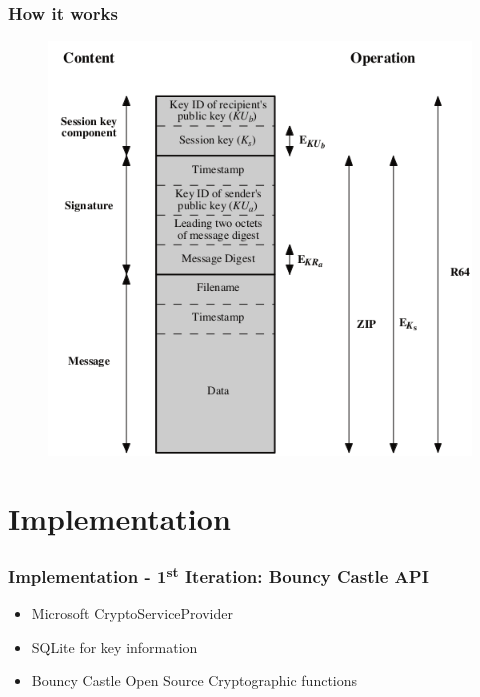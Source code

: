 \documentclass{beamer}
\begin{document}
\begin{frame}
\frametitle{How it works}
\begin{figure}
\includegraphics[scale=0.4]{PgpMsgFormat}
\end{figure}
\end{frame}

\section{Implementation}

\begin{frame}
\frametitle{Implementation - 1\textsuperscript{st} Iteration: Bouncy Castle API}
\begin{itemize}
\item Microsoft CryptoServiceProvider
\item SQLite for key information
\item Bouncy Castle Open Source Cryptographic functions
\end{itemize}
\end{frame}
\end{document}
